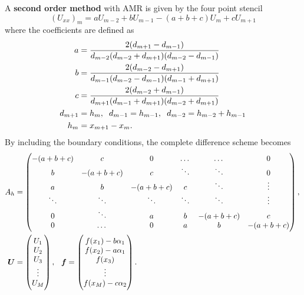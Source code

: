 A \textbf{second order method} with AMR is given by the four point stencil \cite{Liu}
\begin{equation}
\label{4_point_stencil}
    (U_{xx})_m = aU_{m-2} + bU_{m-1} - (a+b+c)U_m + cU_{m+1}
\end{equation}
where the coefficients are defined as
\begin{equation*}
\begin{split}
    a &= \frac{2(d_{m+1}-d_{m-1})}{d_{m-2}(d_{m-2}+d_{m+1})(d_{m-2}-d_{m-1})} \\
    b &= \frac{2(d_{m-2}-d_{m+1})}{d_{m-1}(d_{m-2}-d_{m-1})(d_{m-1}+d_{m+1})} \\
    c &= \frac{2(d_{m-2}+d_{m-1})}{d_{m+1}(d_{m-1}+d_{m+1})(d_{m-2}+d_{m+1})} \\
    d_{m+1} &=h_m, \hspace{2mm} d_{m-1} =h_{m-1}, \hspace{2mm} d_{m-2}=h_{m-2} + h_{m-1} \\ 
    h_m &= x_{m+1} - x_m.
\end{split}
\end{equation*}
By including the boundary conditions, the complete difference scheme becomes
\begin{equation*}
\begin{split}
    A_h &= \begin{pmatrix} 
    -(a+b+c) & c & 0 & \dots & \dots & 0 \\
    b & -(a+b+c) & c & \ddots & \ddots & 0 \\
    a & b & -(a+b+c) & c & \ddots & \vdots \\
    \ddots & \ddots & \ddots & \ddots & \ddots & \vdots\\
    0 & \ddots & a & b & -(a+b+c) & c \\
    0 & \dots & 0 & a & b & -(a+b+c)
    \end{pmatrix}, \, \\
    \boldsymbol{U} &= \begin{pmatrix}
    U_1 \\
    U_2 \\
    U_3 \\
    \vdots \\
    U_M 
    \end{pmatrix}, \, \hspace{2mm} \boldsymbol{f} = \begin{pmatrix}
    f(x_1) - b\alpha_1 \\
    f(x_2) - a\alpha_1\\
    f(x_3) \\
    \vdots \\
    f(x_M) - c\alpha_2
    \end{pmatrix}.
\end{split}
\end{equation*}


